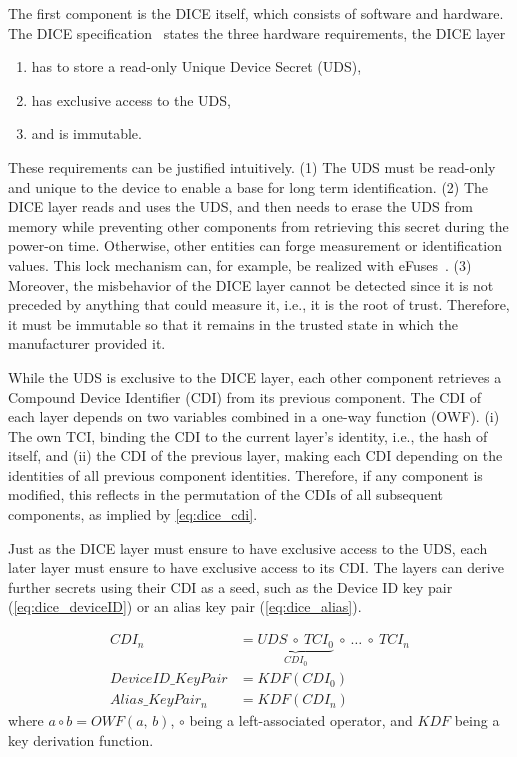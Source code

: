 The first component is the DICE itself, which consists of software and hardware. The DICE specification~\cite{dice-hardware-reqs} states the three hardware requirements, the DICE layer 
\begin{enumerate}
  \item has to store a read-only Unique Device Secret (UDS),
  \item has exclusive access to the UDS,
  \item and is immutable.
\end{enumerate}
These requirements can be justified intuitively.
(1) The UDS must be read-only and unique to the device to enable a base for long term identification.
(2) The DICE layer reads and uses the UDS, and then needs to erase the UDS from memory while preventing other components from retrieving this secret during the power-on time.
Otherwise, other entities can forge measurement or identification values. This lock mechanism can, for example, be realized with eFuses~\cite{dice-hardware-reqs}.
(3) Moreover, the misbehavior of the DICE layer cannot be detected since it is not preceded by anything that could measure it, i.e., it is the root of trust.
Therefore, it must be immutable so that it remains in the trusted state in which the manufacturer provided it.


While the UDS is exclusive to the DICE layer, each other component retrieves a Compound Device Identifier (CDI) from its previous component.
The CDI of each layer depends on two variables combined in a one-way function (OWF).
(i) The own TCI, binding the CDI to the current layer's identity, i.e., the hash of itself, and (ii) the CDI of the previous layer, making each CDI depending on the identities of all previous component identities.
Therefore, if any component is modified, this reflects in the permutation of the CDIs of all subsequent components, as implied by \autoref{eq:dice_cdi}.


Just as the DICE layer must ensure to have exclusive access to the UDS, each later layer must ensure to have exclusive access to its CDI\@.
The layers can derive further secrets using their CDI as a seed, such as the Device ID key pair (\autoref{eq:dice_deviceID}) or an alias key pair (\autoref{eq:dice_alias}).

\noindent
\begin{minipage}{\linewidth}
\begin{align}
  \label{eq:dice_cdi}
  CDI_n &= \underbrace{UDS\ \circ\ TCI_0}_{CDI_0}\ \circ\ \ldots\ \circ\ TCI_n\\
  \label{eq:dice_deviceID}
  DeviceID\_KeyPair &= KDF(CDI_0)\\
  \label{eq:dice_alias}
  Alias\_KeyPair_n  &= KDF(CDI_n)
\end{align}
where \(a \circ b = OWF(a,\,b)\), \(\circ\) being a left-associated operator, and \(KDF\) being a key derivation function.
\end{minipage}
\baselineskip

